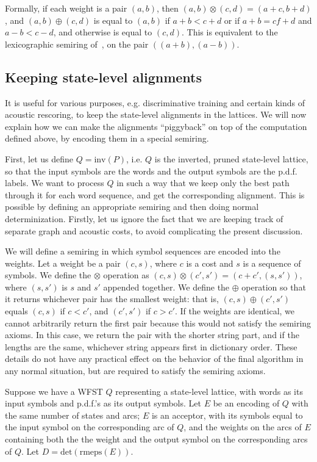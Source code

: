 \documentclass{article}
\def\inv{{\mathrm{inv}}}
\begin{document}
Formally, if each weight is a pair $(a,b)$, then $(a,b) \otimes (c,d) = (a{+}c, b{+}d)$,
and $(a,b) \oplus (c,d)$ is equal to $(a,b)$ if $a{+}b < c{+}d$ or if $a{+}b = c{f}+d$ and $a{-}b < c{-}d$,
and otherwise is equal to $(c,d)$.  This is equivalent to the lexicographic semiring 
of~\cite{roark2011lexicographic}, on the pair $((a{+}b),(a{-}b))$.

\subsection{Keeping state-level alignments}

It is useful for various purposes, e.g. discriminative training and certain kinds of
acoustic rescoring, to keep the state-level alignments in the lattices.  We will now
explain how we can make the alignments ``piggyback'' on top of the computation
defined above, by encoding them in a special semiring.

First, let us define $Q = \inv(P)$, i.e. $Q$ is the inverted, pruned state-level lattice,
so that the input symbols are the words and the output symbols are the p.d.f. labels.
We want to process $Q$ in such a way that we keep only the best path through it
for each word sequence, and get the corresponding alignment.  This is possible
by defining an appropriate semiring and then doing normal determinization.  Firstly, 
let us ignore the fact that we are keeping track of separate graph and acoustic costs, 
to avoid complicating the present discussion.  

We will define a semiring in which symbol sequences are encoded into the weights.
Let a weight be a pair $(c, s)$, where $c$ is a cost and $s$ is a sequence of symbols.
We define the $\otimes$ operation as $(c, s) \otimes (c', s') = (c+c', (s,s'))$, where
$(s,s')$ is $s$ and $s'$ appended together.  We define the $\oplus$ operation so that
it returns whichever pair has the smallest weight: that is, $(c,s) \oplus (c',s')$ 
equals $(c,s)$ if $c < c'$, and $(c',s')$ if $c > c'$.  If the weights are identical,
we cannot arbitrarily return the first pair because this would not satisfy the semiring
axioms.  In this case, we return the pair with the shorter string part, and if
the lengths are the same, whichever string appears first in dictionary order.  These
details do not have any practical effect on the behavior of the final algorithm in any
normal situation, but are required to satisfy the semiring axioms.

Suppose we have a WFST $Q$ representing a state-level lattice, with words
as its input symbols and p.d.f.'s as its output symbols.  Let $E$ be an encoding of $Q$ with the 
same number of states and arcs; $E$ is an acceptor, with its symbols
equal to the input symbol on the corresponding arc of $Q$, and
the weights on the arcs of $E$ containing both the the weight and the output symbol
on the corresponding arcs of $Q$.  Let $D = \mathrm{det}(\mathrm{rmeps}(E))$.
\end{document}

